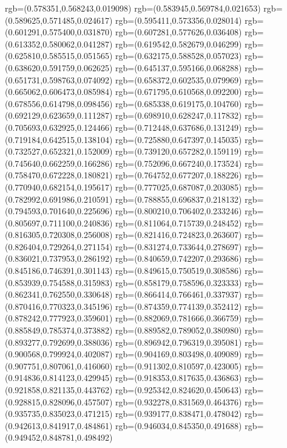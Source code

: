 {{{			rgb=(0.578351,0.568243,0.019098)
			rgb=(0.583945,0.569784,0.021653)
			rgb=(0.589625,0.571485,0.024617)
			rgb=(0.595411,0.573356,0.028014)
			rgb=(0.601291,0.575400,0.031870)
			rgb=(0.607281,0.577626,0.036408)
			rgb=(0.613352,0.580062,0.041287)
			rgb=(0.619542,0.582679,0.046299)
			rgb=(0.625810,0.585515,0.051565)
			rgb=(0.632175,0.588528,0.057023)
			rgb=(0.638620,0.591759,0.062625)
			rgb=(0.645137,0.595166,0.068288)
			rgb=(0.651731,0.598763,0.074092)
			rgb=(0.658372,0.602535,0.079969)
			rgb=(0.665062,0.606473,0.085984)
			rgb=(0.671795,0.610568,0.092200)
			rgb=(0.678556,0.614798,0.098456)
			rgb=(0.685338,0.619175,0.104760)
			rgb=(0.692129,0.623659,0.111287)
			rgb=(0.698910,0.628247,0.117832)
			rgb=(0.705693,0.632925,0.124466)
			rgb=(0.712448,0.637686,0.131249)
			rgb=(0.719184,0.642515,0.138104)
			rgb=(0.725880,0.647397,0.145035)
			rgb=(0.732527,0.652321,0.152009)
			rgb=(0.739120,0.657282,0.159119)
			rgb=(0.745640,0.662259,0.166286)
			rgb=(0.752096,0.667240,0.173524)
			rgb=(0.758470,0.672228,0.180821)
			rgb=(0.764752,0.677207,0.188226)
			rgb=(0.770940,0.682154,0.195617)
			rgb=(0.777025,0.687087,0.203085)
			rgb=(0.782992,0.691986,0.210591)
			rgb=(0.788855,0.696837,0.218132)
			rgb=(0.794593,0.701640,0.225696)
			rgb=(0.800210,0.706402,0.233246)
			rgb=(0.805697,0.711100,0.240836)
			rgb=(0.811064,0.715739,0.248452)
			rgb=(0.816305,0.720308,0.256008)
			rgb=(0.821416,0.724823,0.263607)
			rgb=(0.826404,0.729264,0.271154)
			rgb=(0.831274,0.733644,0.278697)
			rgb=(0.836021,0.737953,0.286192)
			rgb=(0.840659,0.742207,0.293686)
			rgb=(0.845186,0.746391,0.301143)
			rgb=(0.849615,0.750519,0.308586)
			rgb=(0.853939,0.754588,0.315983)
			rgb=(0.858179,0.758596,0.323333)
			rgb=(0.862341,0.762550,0.330648)
			rgb=(0.866414,0.766461,0.337937)
			rgb=(0.870416,0.770323,0.345196)
			rgb=(0.874359,0.774139,0.352412)
			rgb=(0.878242,0.777923,0.359601)
			rgb=(0.882069,0.781666,0.366759)
			rgb=(0.885849,0.785374,0.373882)
			rgb=(0.889582,0.789052,0.380980)
			rgb=(0.893277,0.792699,0.388036)
			rgb=(0.896942,0.796319,0.395081)
			rgb=(0.900568,0.799924,0.402087)
			rgb=(0.904169,0.803498,0.409089)
			rgb=(0.907751,0.807061,0.416060)
			rgb=(0.911302,0.810597,0.423005)
			rgb=(0.914836,0.814123,0.429945)
			rgb=(0.918353,0.817635,0.436863)
			rgb=(0.921858,0.821135,0.443762)
			rgb=(0.925342,0.824620,0.450643)
			rgb=(0.928815,0.828096,0.457507)
			rgb=(0.932278,0.831569,0.464376)
			rgb=(0.935735,0.835023,0.471215)
			rgb=(0.939177,0.838471,0.478042)
			rgb=(0.942613,0.841917,0.484861)
			rgb=(0.946034,0.845350,0.491688)
			rgb=(0.949452,0.848781,0.498492)
}}}
